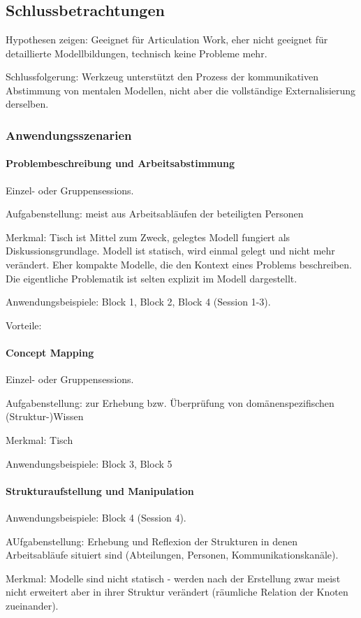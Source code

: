 \part*{}

\chapter{Schlussbetrachtungen} %
\label{cha:schlussbetrachtungen}

Hypothesen zeigen: Geeignet für Articulation Work, eher nicht geeignet für detaillierte Modellbildungen, technisch keine Probleme mehr.

Schlussfolgerung: Werkzeug unterstützt den Prozess der kommunikativen Abstimmung von mentalen Modellen, nicht aber die vollständige Externalisierung derselben.

\section{Anwendungsszenarien} %
\label{sec:anwendungsszenarien}

\subsection{Problembeschreibung und Arbeitsabstimmung}

Einzel- oder Gruppensessions. 

Aufgabenstellung: meist aus Arbeitsabläufen der beteiligten Personen

Merkmal: Tisch ist Mittel zum Zweck, gelegtes Modell fungiert als Diskussionsgrundlage. Modell ist statisch, wird einmal gelegt und nicht mehr verändert. Eher kompakte Modelle, die den Kontext eines Problems beschreiben. Die eigentliche Problematik ist selten explizit im Modell dargestellt.

Anwendungsbeispiele: Block 1, Block 2, Block 4 (Session 1-3).

Vorteile:

\subsection{Concept Mapping}

Einzel- oder Gruppensessions. 

Aufgabenstellung: zur Erhebung bzw. Überprüfung von domänenspezifischen (Struktur-)Wissen

Merkmal: Tisch 

Anwendungsbeispiele: Block 3, Block 5

\subsection{Strukturaufstellung und Manipulation}

Anwendungsbeispiele: Block 4 (Session 4).

AUfgabenstellung: Erhebung und Reflexion der Strukturen in denen Arbeitsabläufe situiert sind (Abteilungen, Personen, Kommunikationskanäle).

Merkmal: Modelle sind nicht statisch - werden nach der Erstellung zwar meist nicht erweitert aber in ihrer Struktur verändert (räumliche Relation der Knoten zueinander). 

